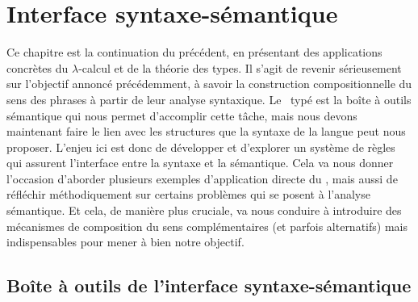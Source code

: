 \chapter{Interface syntaxe-sémantique}
\label{ch:ISS}


Ce chapitre est la continuation du précédent, en présentant des
applications concrètes du $\lambda$-calcul et de la théorie des types.
Il s'agit de revenir sérieusement sur l'objectif annoncé précédemment, à savoir la construction compositionnelle du sens des phrases à partir de leur analyse syntaxique.  Le \lcalcul\ typé est la boîte à outils sémantique qui nous permet d'accomplir cette tâche, mais nous devons maintenant faire le lien avec les structures que la syntaxe de la langue peut nous proposer. 
L'enjeu ici est donc de développer  et d'explorer un système de règles qui assurent l'interface entre la syntaxe et la sémantique.
Cela va nous donner l'occasion d'aborder plusieurs exemples d'application directe du \lcalcul, mais aussi de réfléchir méthodiquement  sur certains problèmes qui se posent à l'analyse sémantique.   Et cela, de manière plus cruciale, va nous conduire à introduire des mécanismes de composition du sens complémentaires (et parfois alternatifs) mais indispensables pour mener à bien notre objectif.


\section{Boîte à outils de l'interface syntaxe-sémantique}

